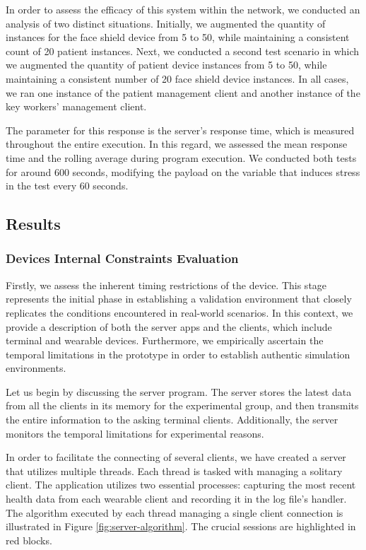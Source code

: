 In order to assess the efficacy of this system within the network, we conducted an analysis of two distinct situations. Initially, we augmented the quantity of instances for the face shield device from 5 to 50, while maintaining a consistent count of 20 patient instances. Next, we conducted a second test scenario in which we augmented the quantity of patient device instances from 5 to 50, while maintaining a consistent number of 20 face shield device instances. In all cases, we ran one instance of the patient management client and another instance of the key workers' management client.

The parameter for this response is the server's response time, which is measured throughout the entire execution. In this regard, we assessed the mean response time and the rolling average during program execution. We conducted both tests for around 600 seconds, modifying the payload on the variable that induces stress in the test every 60 seconds.


\subsection{Results}

\subsubsection{Devices Internal Constraints Evaluation}

Firstly, we assess the inherent timing restrictions of the device. This stage represents the initial phase in establishing a validation environment that closely replicates the conditions encountered in real-world scenarios. In this context, we provide a description of both the server apps and the clients, which include terminal and wearable devices. Furthermore, we empirically ascertain the temporal limitations in the prototype in order to establish authentic simulation environments.

Let us begin by discussing the server program. The server stores the latest data from all the clients in its memory for the experimental group, and then transmits the entire information to the asking terminal clients. Additionally, the server monitors the temporal limitations for experimental reasons. 

In order to facilitate the connecting of several clients, we have created a server that utilizes multiple threads. Each thread is tasked with managing a solitary client. The application utilizes two essential processes: capturing the most recent health data from each wearable client and recording it in the log file's handler. The algorithm executed by each thread managing a single client connection is illustrated in Figure \ref{fig:server-algorithm}. The crucial sessions are highlighted in red blocks.

